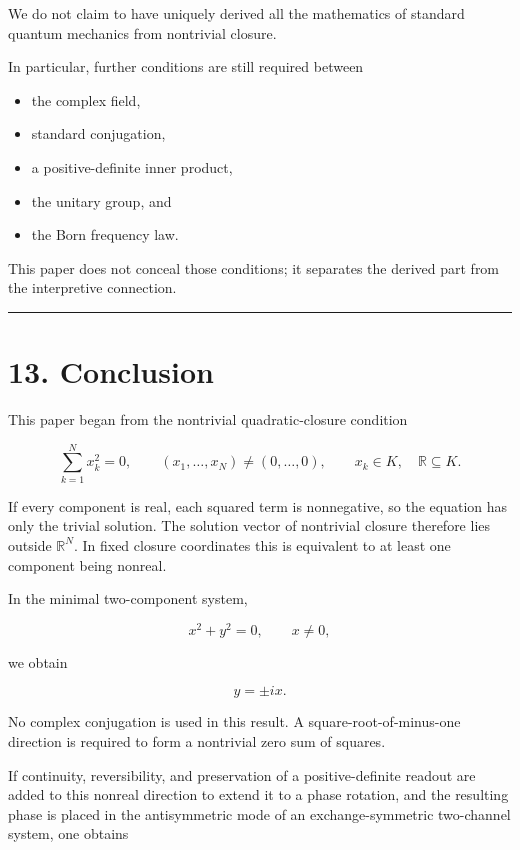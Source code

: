 \documentclass[
  a4paper,
  10pt]{article}
\providecommand{\tightlist}{%
  \setlength{\itemsep}{0pt}\setlength{\parskip}{0pt}}
\begin{document}
We do not claim to have uniquely derived all the mathematics of standard
quantum mechanics from nontrivial closure.

In particular, further conditions are still required between

\begin{itemize}
\tightlist
\item
  the complex field,
\item
  standard conjugation,
\item
  a positive-definite inner product,
\item
  the unitary group, and
\item
  the Born frequency law.
\end{itemize}

This paper does not conceal those conditions; it separates the derived
part from the interpretive connection.

\begin{center}\rule{0.5\linewidth}{0.5pt}\end{center}

\section{13. Conclusion}\label{13-conclusion}

This paper began from the nontrivial quadratic-closure condition

\[
\boxed{
\sum_{k=1}^{N}x_k^2=0,
\qquad
(x_1,\ldots,x_N)\neq(0,\ldots,0),
\qquad
x_k\in K,
\quad
\mathbb R\subseteq K
}.
\]

If every component is real, each squared term is nonnegative, so the
equation has only the trivial solution. The solution vector of
nontrivial closure therefore lies outside \(\mathbb R^N\). In fixed
closure coordinates this is equivalent to at least one component being
nonreal.

In the minimal two-component system,

\[
x^2+y^2=0,
\qquad x\neq0,
\]

we obtain

\[
\boxed{
y=\pm ix
}.
\]

No complex conjugation is used in this result. A
square-root-of-minus-one direction is required to form a nontrivial zero
sum of squares.

If continuity, reversibility, and preservation of a positive-definite
readout are added to this nonreal direction to extend it to a phase
rotation, and the resulting phase is placed in the antisymmetric mode of
an exchange-symmetric two-channel system, one obtains
\end{document}
